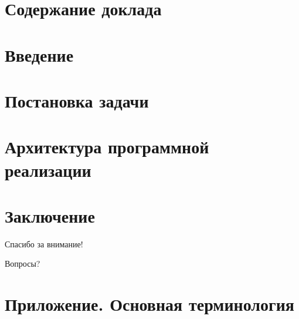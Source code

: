 \documentclass[9pt]{beamer}
\begin{document}

\section*{Содержание доклада}
\begin{frame}

{\smaller[1]
\setcounter{tocdepth}{1}
\tableofcontents}
\setcounter{tocdepth}{2}

\end{frame}
\section{Введение}

\section{Постановка задачи}

\section{Архитектура программной реализации}

\section*{Заключение}

\def\secname{}

\begin{frame}

\begin{center}
\LARGE
Спасибо за внимание!
\vspace{1cm}

Вопросы?
\end{center}

\end{frame}
\section*{Приложение. Основная терминология}
\begin{frame}[allowframebreaks=0.9,t]

\printglossary[style=index, type=\acronymtype, title=Аббревиатуры, nopostdot=false]

\end{frame}
\end{document}
